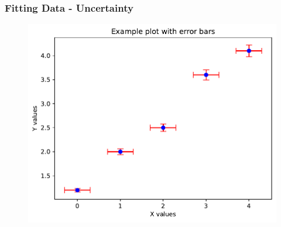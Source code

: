 \documentclass{beamer}
\begin{document}
\begin{frame}
  \frametitle{Fitting Data - Uncertainty}
  \begin{figure}[H]
    \centering
    \begin{samepage}
        \includegraphics[width=0.65\linewidth]{fig/fitting4.pdf}
    \end{samepage}
\end{figure}
\end{frame}
\end{document}
